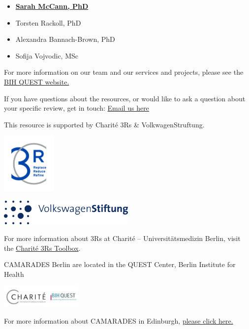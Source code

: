 \documentclass[
]{book}
\providecommand{\tightlist}{%
  \setlength{\itemsep}{0pt}\setlength{\parskip}{0pt}}
\begin{document}
\begin{itemize}
\tightlist
\item
  \textbf{\href{https://www.bihealth.org/en/quest/teams/team/research-group-mccann}{Sarah McCann, PhD}}
\item
  Torsten Rackoll, PhD
\item
  Alexandra Bannach-Brown, PhD
\item
  Sofija Vojvodic, MSc
\end{itemize}

For more information on our team and our services and projects, please see the \href{https://www.bihealth.org/en/quest/service/service/camarades-facility-for-the-systematic-review-and-meta-analysis-1}{BIH QUEST website.}

If you have questions about the resources, or would like to ask a question about your specific review, get in touch: \href{mailto:CAMARADES.berlin@charite.de}{Email us here}

This resource is supported by Charité 3Rs \& VolkwagenStruftung.

\includegraphics[width=0.2\textwidth,height=\textheight]{figs/C3R_Screen_Farbe.jpg}

\includegraphics[width=0.5\textwidth,height=\textheight]{figs/Logo_Volkswagen.png}

For more information about 3Rs at Charité -- Universitätsmedizin Berlin, visit the \href{https://charite3r.charite.de/en/charite_3r_toolbox/}{Charité 3Rs Toolbox}.

CAMARADES Berlin are located in the QUEST Center, Berlin Institute for Health

\includegraphics[width=0.3\textwidth,height=\textheight]{charite-BIHquest.jpg}

For more information about CAMARADES in Edinburgh, \href{https://www.ed.ac.uk/clinical-brain-sciences/research/camarades}{please click here.}

  
\end{document}
